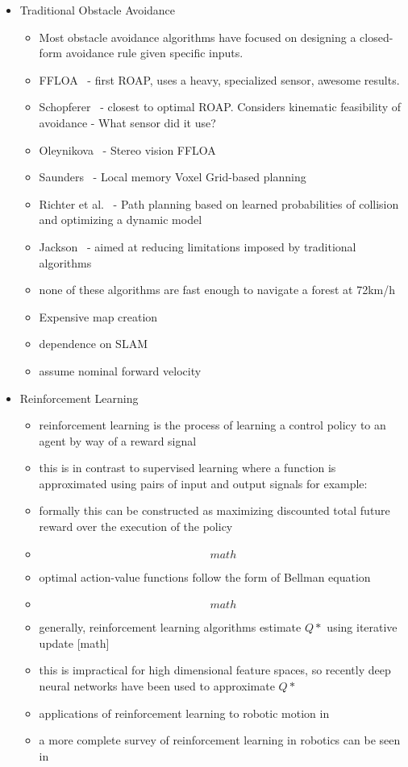 \documentclass[paper=a4, fontsize=11pt]{scrartcl} %
\begin{document}
\begin{itemize}
\item Traditional Obstacle Avoidance
	\begin{itemize}
		\item Most obstacle avoidance algorithms have focused on designing a closed-form avoidance rule given specific inputs.
		\item FFLOA~\cite{Scherer2007} - first ROAP, uses a heavy, specialized sensor, awesome results.
		\item Schopferer~\cite{Schopferer2014} - closest to optimal ROAP.  Considers kinematic feasibility of avoidance - What sensor did it use?
		\item Oleynikova~\cite{Oleynikova2015} - Stereo vision FFLOA
		\item Saunders~\cite{Saunders2009} - Local memory Voxel Grid-based planning
		\item Richter et al.~\cite{Richter2014} - Path planning based on learned probabilities of collision and optimizing a dynamic model
		\item Jackson~\cite{CEPA} - aimed at reducing limitations imposed by traditional algorithms
		\item none of these algorithms are fast enough to navigate a forest at 72km/h
		\item Expensive map creation
		\item dependence on SLAM
		\item assume nominal forward velocity
	\end{itemize}

\item  Reinforcement Learning
	\begin{itemize}
		\item reinforcement learning is the process of learning a control policy to an agent by way of a reward signal
		\item this is in contrast to supervised learning where a function is approximated using pairs of input and output signals for example: \cite{Ross2013}
		\item formally this can be constructed as maximizing discounted total future reward over the execution of the policy
		\item \[math\]
		\item optimal action-value functions follow the form of Bellman equation
		\item \[math\]
		\item generally, reinforcement learning algorithms estimate $Q*$ using iterative update [math] \cite{Sutton:1998:IRL:551283}
		\item this is impractical for high dimensional feature spaces, so recently deep neural networks have been used to approximate $Q*$ \cite{Mnih2013}
		\item applications of reinforcement learning to robotic motion in \cite{DBLP:conf/icra/KohlS04,DBLP:conf/iros/TedrakeZS04,geng2005fast,bagnell2001autonomous, riedmiller2009reinforcement}
		\item a more complete survey of reinforcement learning in robotics can be seen in \cite{kober2013reinforcement}
	\end{itemize}


\end{itemize}
\end{document}
